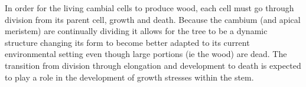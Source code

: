 In order for the living cambial cells to produce wood, each cell must go through
division from its parent cell, growth and death. Because the cambium (and apical
meristem) are continually dividing it allows for the tree to be a dynamic
structure changing its form to become better adapted to its current
environmental setting even though large portions (ie the wood) are dead. The
transition from division through elongation and development to death is expected
to play a role in the development of growth stresses within the stem.